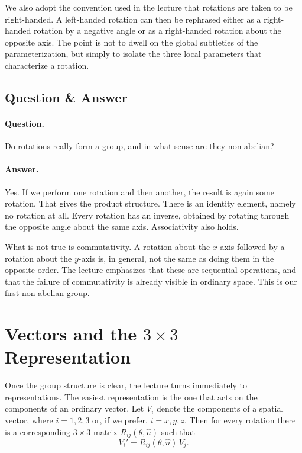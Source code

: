 We also adopt the convention used in the lecture that rotations are taken to be right-handed. A left-handed rotation can then be rephrased either as a right-handed rotation by a negative angle or as a right-handed rotation about the opposite axis. The point is not to dwell on the global subtleties of the parameterization, but simply to isolate the three local parameters that characterize a rotation.

\subsection{Question \& Answer}

\paragraph{Question.} Do rotations really form a group, and in what sense are they non-abelian?

\paragraph{Answer.} Yes. If we perform one rotation and then another, the result is again some rotation. That gives the product structure. There is an identity element, namely no rotation at all. Every rotation has an inverse, obtained by rotating through the opposite angle about the same axis. Associativity also holds.

What is not true is commutativity. A rotation about the \(x\)-axis followed by a rotation about the \(y\)-axis is, in general, not the same as doing them in the opposite order. The lecture emphasizes that these are sequential operations, and that the failure of commutativity is already visible in ordinary space. This is our first non-abelian group.

\section{Vectors and the \(3\times 3\) Representation}

Once the group structure is clear, the lecture turns immediately to representations. The easiest representation is the one that acts on the components of an ordinary vector. Let \(V_i\) denote the components of a spatial vector, where \(i=1,2,3\) or, if we prefer, \(i=x,y,z\). Then for every rotation there is a corresponding \(3\times 3\) matrix \(R_{ij}(\theta,\hat n)\) such that
\begin{equation}
V_i' = R_{ij}(\theta,\hat n)\,V_j .
\end{equation}

